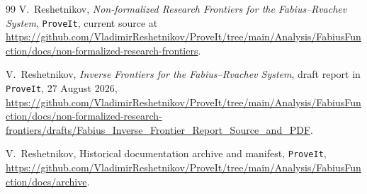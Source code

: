 \documentclass[11pt,oneside]{article}
\numberwithin{equation}{section}
\theoremstyle{definition}
\theoremstyle{remark}
\begin{document}
\begin{thebibliography}{99}
V.~Reshetnikov,
\newblock \emph{Non-formalized Research Frontiers for the Fabius--Rvachev System},
\newblock \texttt{ProveIt}, current source at
\url{https://github.com/VladimirReshetnikov/ProveIt/tree/main/Analysis/FabiusFunction/docs/non-formalized-research-frontiers}.

V.~Reshetnikov,
\newblock \emph{Inverse Frontiers for the Fabius--Rvachev System},
\newblock draft report in \texttt{ProveIt}, 27 August 2026,
\url{https://github.com/VladimirReshetnikov/ProveIt/tree/main/Analysis/FabiusFunction/docs/non-formalized-research-frontiers/drafts/Fabius_Inverse_Frontier_Report_Source_and_PDF}.

V.~Reshetnikov,
\newblock Historical documentation archive and manifest,
\newblock \texttt{ProveIt},
\url{https://github.com/VladimirReshetnikov/ProveIt/tree/main/Analysis/FabiusFunction/docs/archive}.

\end{thebibliography}
\end{document}
